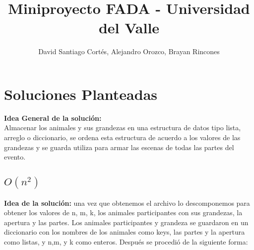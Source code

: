 \documentclass{article}
\title{Miniproyecto FADA - Universidad del Valle}
\date{}
\author{David Santiago Cortés, Alejandro Orozco, Brayan Rincones}
\begin{document}
	\maketitle

	\section{Soluciones Planteadas}
		\textbf{Idea General de la solución:}\\
		Almacenar los animales y sus grandezas en una estructura de datos tipo lista, arreglo o diccionario, 
		se ordena esta estructura de acuerdo a los valores de las grandezas y se guarda utiliza para armar las
		escenas de todas las partes del evento.\\	
		\subsection{$O(n^2)$}
			\textbf{Idea de la solución:} una vez que obtenemos el archivo lo descomponemos para obtener los valores de n, m, k, los animales participantes con sus grandezas, la apertura y las partes. Los animales participantes y grandeza se guardaron en un diccionario con los nombres de los animales como keys, las partes y la apertura como listas, y n,m, y k como enteros. Después se procedió de la siguiente forma:
\end{document}
